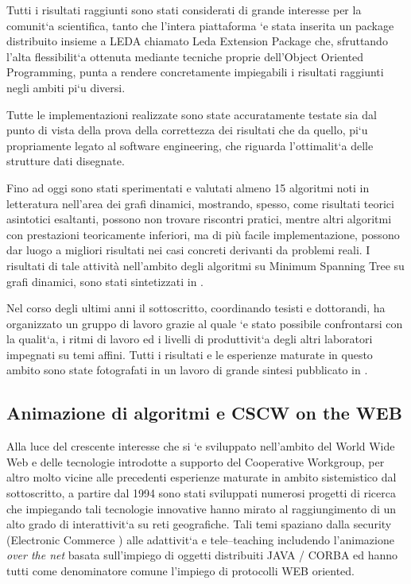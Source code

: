 \documentclass[11pt]{article}
\begin{document}
Tutti i risultati raggiunti sono stati considerati di grande interesse
per la comunit\a`a scientifica, tanto che l'intera piattaforma \a`e
stata inserita un package distribuito insieme a LEDA chiamato Leda
Extension Package \cite{ALEX:98} che, sfruttando l'alta
flessibilit\a`a ottenuta mediante tecniche proprie dell'Object
Oriented Programming, punta a rendere concretamente impiegabili i
risultati raggiunti negli ambiti pi\a`u diversi.

Tutte le implementazioni realizzate sono state accuratamente testate 
sia dal punto di vista della prova della correttezza dei risultati che da
quello,  pi\a`u propriamente legato al software engineering, che
riguarda  l'ottimalit\a`a delle strutture dati disegnate. 

Fino ad oggi sono stati sperimentati e valutati almeno 15 algoritmi
noti in letteratura nell'area dei grafi dinamici, mostrando, spesso,
come risultati teorici asintotici esaltanti, possono non trovare
riscontri pratici, mentre altri algoritmi con prestazioni teoricamente
inferiori, ma di pi\`u facile implementazione, possono dar luogo a
migliori risultati nei casi concreti derivanti da problemi reali. I
risultati di tale attivit\`a nell'ambito degli algoritmi su Minimum
Spanning Tree su grafi dinamici, sono stati sintetizzati in \cite{SODA97:2}.

Nel corso degli ultimi anni il sottoscritto, coordinando tesisti e
dottorandi, ha organizzato un gruppo di lavoro grazie al quale \a`e
stato possibile confrontarsi con la qualit\a`a, i ritmi di lavoro ed i
livelli di produttivit\a`a degli altri laboratori impegnati su temi
affini. Tutti i risultati e le esperienze maturate in questo ambito
sono state fotografati in un lavoro di grande sintesi pubblicato in
\cite{acmcs:98}.

\subsection{Animazione di algoritmi e CSCW on the WEB }

Alla luce del crescente interesse che si \a`e sviluppato nell'ambito
del World Wide Web e delle tecnologie introdotte a supporto del
Cooperative Workgroup, per altro molto vicine alle precedenti
esperienze maturate in ambito sistemistico dal sottoscritto,
a partire dal 1994 sono
stati sviluppati numerosi progetti di ricerca che impiegando tali
tecnologie innovative hanno mirato al raggiungimento di un alto grado
di interattivit\a`a su reti geografiche.  Tali temi spaziano dalla
security (Electronic Commerce \cite{ECom:1,ECom:2,CABOTO:98}) alle
adattivit\a`a e tele--teaching \cite{RETIS:97} includendo l'animazione
{\sl over the net} basata sull'impiego di oggetti distribuiti JAVA /
CORBA ed hanno tutti come denominatore comune l'impiego di protocolli
WEB oriented.
\end{document}
